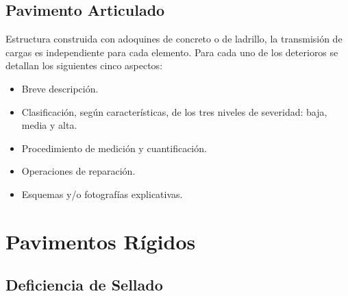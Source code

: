 \documentclass[letterpaper,10pt,spanish]{sphinxmanual}
\begin{document}
\subsection{Pavimento Articulado}
\label{patologia/introduccion:pavimento-articulado}
Estructura construida con adoquines de concreto o de ladrillo, la transmisión
de cargas es independiente para cada elemento.
Para cada uno de los deterioros se detallan los siguientes cinco aspectos:
\begin{itemize}
\item {} 
Breve descripción.

\item {} 
Clasificación, según características, de los tres niveles de severidad: baja, media y alta.

\item {} 
Procedimiento de medición y cuantificación.

\item {} 
Operaciones de reparación.

\item {} 
Esquemas y/o fotografías explicativas.

\end{itemize}
\begin{figure}[htbp]
\centering

\end{figure}
\begin{quote}
\end{quote}


\section{Pavimentos Rígidos}
\label{patologia/rigidos::doc}\label{patologia/rigidos:patologia-rigidos}\label{patologia/rigidos:pavimentos-rigidos}

\subsection{Deficiencia de Sellado}
\label{patologia/rigidos:deficiencia-de-sellado}
\end{document}
